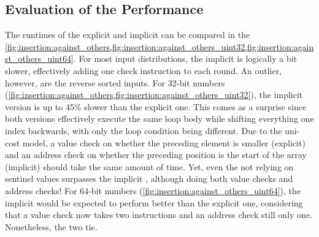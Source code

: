 \subsection*{Evaluation of the Performance}
\label{sec:tasklet:insertion:performance}

\def\insertionalgos{1NoSentinel,1,1Implicit,BubbleNonAdapt,BubbleAdapt,Selection}


The runtimes of the explicit and implicit \IS*{} can be compared in the \cref{fig:insertion:against_others,fig:insertion:against_others_uint32,fig:insertion:against_others_uint64}.
For most input distributions, the implicit \IS{} is logically a bit slower, effectively adding one check instruction to each round.
An outlier, however, are the reverse sorted inputs.
For 32-bit numbers (\cref{fig:insertion:against_others,fig:insertion:against_others_uint32}), the implicit version is up to 45\% slower than the explicit one.
This comes as a surprise since both versions effectively execute the same loop body while shifting everything one index backwards, with only the loop condition being different.
Due to the uni-cost model, a value check on whether the preceding element is smaller (explicit) and an address check on whether the preceding position is the start of the array (implicit) should take the same amount of time.
Yet, even the \IS{} not relying on sentinel values surpasses the implicit \IS{}, although doing both value checks and address checks!
For 64-bit numbers (\cref{fig:insertion:against_others_uint64}), the implicit \IS{} would be expected to perform better than the explicit one, considering that a value check now takes two instructions and an address check still only one.
Nonetheless, the two \IS*{} tie.

